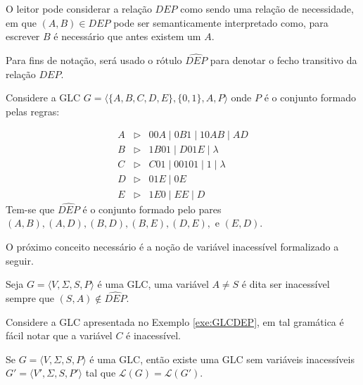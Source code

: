 O leitor pode considerar a relação $DEP$ como sendo uma relação de necessidade, em que $(A, B) \in DEP$ pode ser semanticamente interpretado como, para escrever $B$ é necessário que antes existem um $A$.

\begin{remark}
    Para fins de notação, será usado o rótulo $\widehat{DEP}$ para denotar o fecho transitivo da relação $DEP$.
\end{remark}

\begin{example}\label{exe:GLCDEP}
    Considere a GLC $G = \langle \{A, B, C, D, E\}, \{0, 1\}, A, P \rangle$ onde $P$ é o conjunto formado pelas regras:
    
    \begin{eqnarray*}
        A & \rhd & 00A \mid 0B1 \mid 10AB \mid AD\\ 
        B & \rhd & 1B01 \mid D01E\mid \lambda\\
        C & \rhd & C01 \mid 00101 \mid 1 \mid \lambda\\
        D & \rhd & 01E \mid 0E\\
        E & \rhd & 1E0 \mid EE \mid D
    \end{eqnarray*}
    Tem-se que $\widehat{DEP}$ é o conjunto formado pelo pares $(A, B), (A, D), (B, D), (B, E), (D, E),$ e $(E, D)$.
\end{example}

O próximo conceito necessário é a noção de variável inacessível formalizado a seguir.

\begin{definition}\label{def:VariavelInacessível}
    Seja $G = \langle V, \Sigma, S, P\rangle$ é uma GLC, uma variável $A \neq S$ é dita ser inacessível sempre que $(S, A) \notin \widehat{DEP}$.
\end{definition}

\begin{example}
    Considere a GLC apresentada no Exemplo \ref{exe:GLCDEP}, em tal gramática é fácil notar que a variável $C$ é inacessível.
\end{example}

\begin{lemma}\label{lema:SemInacessivel}
    Se $G = \langle V, \Sigma, S, P\rangle$ é uma GLC, então existe uma GLC sem variáveis inacessíveis $G' = \langle V', \Sigma, S, P'\rangle$ tal que $\mathcal{L}(G) = \mathcal{L}(G')$.
\end{lemma}

